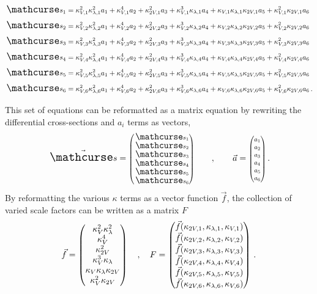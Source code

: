     \vspace{-0.5in}
    \begin{eqnarray} \label{eq:allsixxsecs}
        \crossterm{1} \nonumber \\
        \crossterm{2} \nonumber \\
        \crossterm{3} \nonumber \\
        \crossterm{4} \nonumber \\
        \crossterm{5} \nonumber \\
        \crossterm{6} \nonumber \,. \\
    \end{eqnarray}

    This set of equations can be reformatted as a matrix equation
        by rewriting the differential cross-sections and $a_i$ terms as vectors,
    \begin{equation}
        \vec{\xsec} = \minimatrix{ \xsec_{1} \\ \xsec_{2} \\ \xsec_{3} \\ \xsec_{4} \\ \xsec_{5} \\ \xsec_{6} }
        \qquad,\qquad
        \vec{a} = \minimatrix{ a_1 \\ a_2 \\ a_3 \\ a_4 \\ a_5 \\ a_6 }
        \,.
    \end{equation}
    By reformatting the various $\kappa$ terms as a vector function $\vec{f}$,
        the collection of varied scale factors can be written as a matrix $F$
    \begin{equation}
        \vec{f} = \begin{pmatrix} \kappa_{V}^2 \kappa_{\lambda}^2 \\ \kappa_{V}^4 \\ \kappa_{2V}^2 \\ \kappa_{V}^3 \kappa_{\lambda} \\ \kappa_{V} \kappa_{\lambda} \kappa_{2V} \\ \kappa_{V}^2 \kappa_{2V} \end{pmatrix}
        \quad,\quad
        F = \begin{pmatrix}
            \vec{f}(\kappa_{2V,1}, \kappa_{\lambda,1}, \kappa_{V,1}) \\
            \vec{f}(\kappa_{2V,2}, \kappa_{\lambda,2}, \kappa_{V,2}) \\
            \vec{f}(\kappa_{2V,3}, \kappa_{\lambda,3}, \kappa_{V,3}) \\
            \vec{f}(\kappa_{2V,4}, \kappa_{\lambda,4}, \kappa_{V,4}) \\
            \vec{f}(\kappa_{2V,5}, \kappa_{\lambda,5}, \kappa_{V,5}) \\
            \vec{f}(\kappa_{2V,6}, \kappa_{\lambda,6}, \kappa_{V,6}) \\
        \end{pmatrix}
        \,.
    \end{equation}

